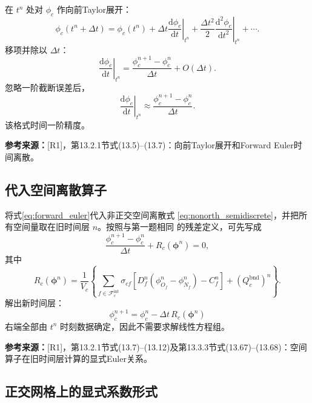 \documentclass[UTF8,12pt,a4paper]{ctexart}
\numberwithin{equation}{section}
\newcommand{\Rone}{\textnormal{[R1]}}
\newcommand{\source}[1]{%
  \par\smallskip
  \noindent\colorbox{sourcebg}{%
    \parbox{0.955\linewidth}{\raggedright\footnotesize\color{sourcegray}\textbf{参考来源：}#1}%
  }
  \par\smallskip
}
\begin{document}
在 $t^n$ 处对 $\phi_c$ 作向前Taylor展开：
\begin{equation}
  \phi_c(t^n+\Delta t)
  =\phi_c(t^n)
  +\Delta t\left.\frac{\mathrm d\phi_c}{\mathrm dt}\right|_{t^n}
  +\frac{\Delta t^2}{2}
   \left.\frac{\mathrm d^2\phi_c}{\mathrm dt^2}\right|_{t^n}
  +\cdots.
  \label{eq:taylor_time}
\end{equation}
移项并除以 $\Delta t$：
\begin{equation}
  \left.\frac{\mathrm d\phi_c}{\mathrm dt}\right|_{t^n}
  =\frac{\phi_c^{n+1}-\phi_c^n}{\Delta t}
  +O(\Delta t).
  \label{eq:forward_difference}
\end{equation}
忽略一阶截断误差后，
\begin{equation}
  \boxed{
  \left.\frac{\mathrm d\phi_c}{\mathrm dt}\right|_{t^n}
  \approx\frac{\phi_c^{n+1}-\phi_c^n}{\Delta t}}.
  \label{eq:forward_euler}
\end{equation}
该格式时间一阶精度。

\source{\Rone，第13.2.1节式(13.5)--(13.7)：向前Taylor展开和Forward Euler时间离散。}

\subsection{代入空间离散算子}

将式\eqref{eq:forward_euler}代入非正交空间离散式
\eqref{eq:nonorth_semidiscrete}，并把所有空间量取在旧时间层 $n$。按照与第一题相同
的残差定义，可先写成
\begin{equation}
  \frac{\phi_c^{n+1}-\phi_c^n}{\Delta t}
  +R_c(\bm\phi^n)=0,
  \label{eq:fully_discrete_before_solve}
\end{equation}
其中
\begin{equation}
  R_c(\bm\phi^n)
  =\frac{1}{V_c}\left\{
  \sum_{f\in\mathcal F_c^{\mathrm{int}}}
  \sigma_{cf}\left[
  D_f^n(\phi_{O_f}^n-\phi_{N_f}^n)-C_f^n\right]+(Q_c^{\mathrm{bnd}})^n
  \right\}.
  \label{eq:explicit_diffusive_residual}
\end{equation}
解出新时间层：
\begin{equation}
  \boxed{
  \phi_c^{n+1}
  =\phi_c^n
  -\Delta t\,R_c(\bm\phi^n)}
  \label{eq:fully_explicit_general}
\end{equation}
右端全部由 $t^n$ 时刻数据确定，因此不需要求解线性方程组。

\source{\Rone，第13.2.1节式(13.7)--(13.12)及第13.3.3节式(13.67)--(13.68)：空间算子在旧时间层计算的显式Euler关系。}

\subsection{正交网格上的显式系数形式}
\end{document}
